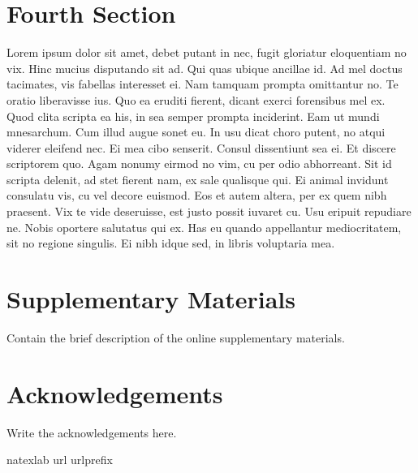 \documentclass[12pt]{article} %
\theoremstyle{definition}
\begin{document}
\section{Fourth Section}
Lorem ipsum dolor sit amet, debet putant in nec, fugit gloriatur eloquentiam no vix. Hinc mucius disputando sit ad. Qui quas ubique ancillae id. Ad mel doctus tacimates, vis fabellas interesset ei.
Nam tamquam prompta omittantur no. Te oratio liberavisse ius. Quo ea eruditi fierent, dicant exerci forensibus mel ex. Quod clita scripta ea his, in sea semper prompta inciderint. Eam ut mundi mnesarchum. Cum illud augue sonet eu.
In usu dicat choro putent, no atqui viderer eleifend nec. Ei mea cibo senserit. Consul dissentiunt sea ei. Et discere scriptorem quo. Agam nonumy eirmod no vim, cu per odio abhorreant.
Sit id scripta delenit, ad stet fierent nam, ex sale qualisque qui. Ei animal invidunt consulatu vis, cu vel decore euismod. Eos et autem altera, per ex quem nibh praesent. Vix te vide deseruisse, est justo possit iuvaret cu.
Usu eripuit repudiare ne. Nobis oportere salutatus qui ex. Has eu quando appellantur mediocritatem, sit no regione singulis. Ei nibh idque sed, in libris voluptaria mea.
\section*{Supplementary Materials}

Contain
the brief description of the online supplementary materials.
\par
\section*{Acknowledgements}

Write the acknowledgements here.
\par






\bibhang=1.7pc
\bibsep=2pt
\fontsize{9}{14pt plus.8pt minus .6pt}\selectfont
\renewcommand\bibname{\large \bf References}
\expandafter\ifx\csname
natexlab\endcsname\relax\def\natexlab#1{#1}\fi
\expandafter\ifx\csname url\endcsname\relax
  \def\url#1{\texttt{#1}}\fi
\expandafter\ifx\csname urlprefix\endcsname\relax\def\urlprefix{URL}\fi
\end{document}
